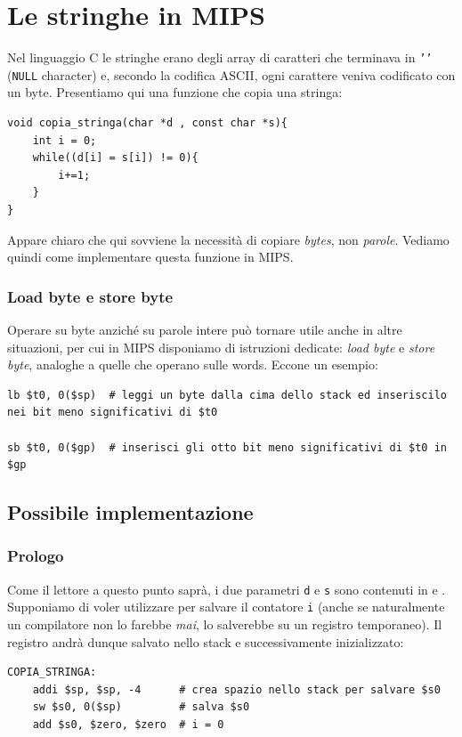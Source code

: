 \documentclass[class=book, crop=false, oneside]{standalone}
\begin{document}
\section{Le stringhe in MIPS}\label{sec:mipstring}
Nel linguaggio C le stringhe erano degli array di caratteri che terminava in \texttt{'\0'} (\texttt{NULL} character)
e, secondo la codifica ASCII, ogni carattere veniva codificato con un byte. Presentiamo qui una funzione che copia una stringa:
\begin{verbatim}
void copia_stringa(char *d , const char *s){
	int i = 0;
	while((d[i] = s[i]) != 0){
		i+=1;
	}
}
\end{verbatim}
Appare chiaro che qui sovviene la necessità di copiare \emph{bytes}, non \emph{parole}. Vediamo quindi come implementare questa funzione in MIPS.

\subsubsection{Load byte e store byte}
Operare su byte anziché su parole intere può tornare utile anche in altre situazioni, per cui in MIPS disponiamo di istruzioni dedicate: \emph{load byte} e \emph{store byte}, analoghe a quelle che operano sulle words. Eccone un esempio:
\begin{verbatim}
lb $t0, 0($sp)  # leggi un byte dalla cima dello stack ed inseriscilo nei bit meno significativi di $t0

sb $t0, 0($gp)  # inserisci gli otto bit meno significativi di $t0 in $gp
\end{verbatim}

\subsection{Possibile implementazione}

\subsubsection{Prologo}
Come il lettore a questo punto saprà, i due parametri \texttt{d} e \texttt{s} sono contenuti in  e . Supponiamo di voler utilizzare  per salvare il contatore \texttt{i} (anche se naturalmente un compilatore non lo farebbe \emph{mai}, lo salverebbe su un registro temporaneo). Il registro  andrà dunque salvato nello stack e successivamente inizializzato:
\begin{verbatim}
COPIA_STRINGA:
	addi $sp, $sp, -4      # crea spazio nello stack per salvare $s0
	sw $s0, 0($sp)         # salva $s0
	add $s0, $zero, $zero  # i = 0
\end{verbatim}
\end{document}
